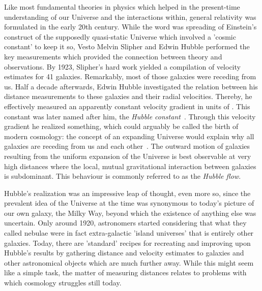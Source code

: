 
Like most fundamental theories in physics which helped in the present-time
understanding of our Universe and the interactions within, general relativity
was formulated in the early 20th century.  While the word was spreading of
Einstein's construct of the supposedly quasi-static Universe which involved a
'cosmic constant' to keep it so, Vesto Melvin Slipher and Edwin Hubble performed
the key measurements which provided the connection between theory and
observations.  By 1923, Slipher's hard work yielded a compilation of velocity
estimates for 41 galaxies.  Remarkably, most of those galaxies were receding
from us.  Half a decade afterwards, Edwin Hubble investigated the relation
between his distance measurements to these galaxies and their radial velocities.
Thereby, he effectively measured an apparently constant velocity gradient in
units of \Hunitsalt.  This constant was later named after him, the
\textit{Hubble constant}~\Ho.  Through this velocity gradient he realized
something, which could arguably be called the birth of modern cosmology: the
concept of an expanding Universe would explain why all galaxies are receding
from us and each other~.  The
outward motion of galaxies resulting from the uniform expansion of the Universe
is best observable at very high distances where the local, mutual gravitational
interaction between galaxies is subdominant.  This behaviour is commonly
referred to as the \textit{Hubble flow}.

Hubble's realization was an impressive leap of thought, even more so, since the
prevalent idea of the Universe at the time was synonymous to today's picture of
our own galaxy, the Milky Way, beyond which the existence of anything else was
uncertain.  Only around 1920, astronomers started considering that what they
called nebulae were in fact extra-galactic 'island universes' that is entirely
other galaxies.  Today, there are 'standard' recipes for recreating and
improving upon Hubble's results by gathering distance and velocity estimates to
galaxies and other astronomical objects which are much further away.  While this
might seem like a simple task, the matter of measuring distances relates to
problems with which cosmology struggles still today.  

